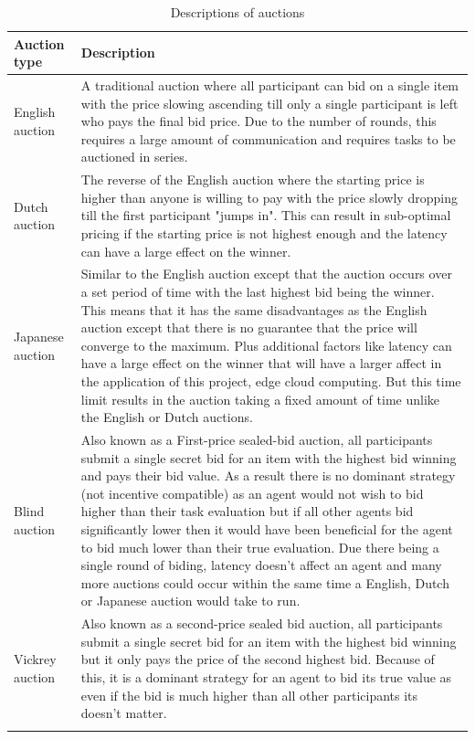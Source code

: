 \begin{longtable}{|p{3cm}|p{10cm}|} \hline
    \textbf{Auction type} & \textbf{Description} \\ \hline
    English auction & A traditional auction where all participant can bid on a single item with the price slowing ascending till
    only a single participant is left who pays the final bid price. Due to the number of rounds, this requires a large amount of
    communication and requires tasks to be auctioned in series. \\ \hline

    Dutch auction & The reverse of the English auction where the starting price is higher than anyone is willing to pay with the price
    slowly dropping till the first participant "jumps in". This can result in sub-optimal pricing if the starting price is not highest enough
    and the latency can have a large effect on the winner. \\ \hline

    Japanese auction & Similar to the English auction except that the auction occurs over a set period of time with the last highest
    bid being the winner. This means that it has the same disadvantages as the English auction except that there is no guarantee
    that the price will converge to the maximum. Plus additional factors like latency can have a large effect on the winner that
    will have a larger affect in the application of this project, edge cloud computing.
    But this time limit results in the auction taking a fixed amount of time unlike the English or Dutch auctions. \\ \hline

    Blind auction & Also known as a First-price sealed-bid auction, all participants submit a single secret bid for an item with the highest bid winning and
    pays their bid value. As a result there is no dominant strategy (not incentive compatible) as an agent would not wish to bid higher than their task evaluation
    but if all other agents bid significantly lower then it would have been beneficial for the agent to bid much lower than their true evaluation.
    Due there being a single round of biding, latency doesn't affect an agent and many more auctions could occur within the same time a English,
    Dutch or Japanese auction would take to run. \\ \hline

    Vickrey auction~\citep{vickrey} & Also known as a second-price sealed bid auction, all participants submit a single secret bid
    for an item with the highest bid winning but it only pays the price of the second highest bid. Because of this, it is a dominant
    strategy for an agent to bid its true value as even if the bid is much higher than all other participants its doesn't matter. \\ \hline

    \caption{Descriptions of auctions}
    \label{tab:auctions_descriptions}
\end{longtable}

